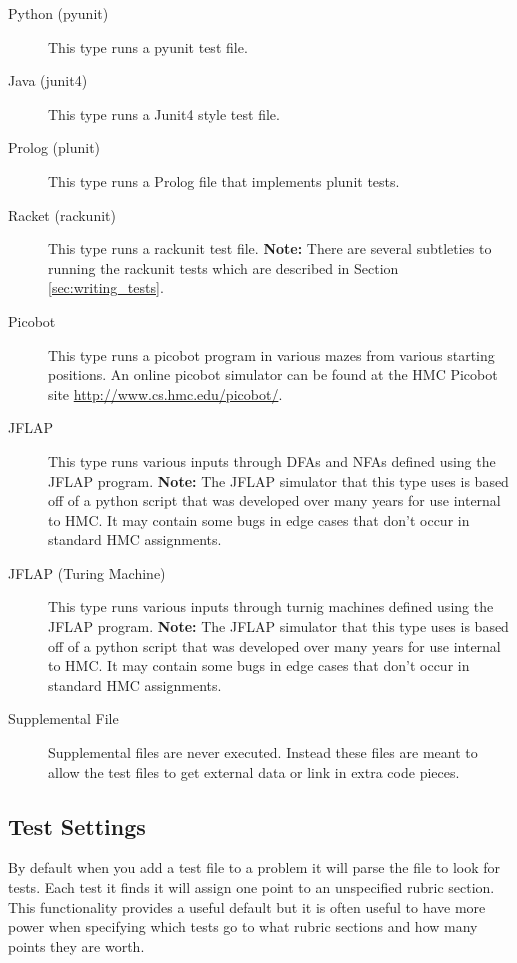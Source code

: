 \documentclass[11pt]{report}
\begin{document}
\begin{description}
\item[Python (pyunit)] This type runs a pyunit test file.
\item[Java (junit4)] This type runs a Junit4 style test file.
\item[Prolog (plunit)] This type runs a Prolog file that implements plunit tests.
\item[Racket (rackunit)] This type runs a rackunit test file. \textbf{Note:} There are 
several subtleties to running the rackunit tests which are described in Section \ref{sec:writing_tests}.
\item[Picobot] This type runs a picobot program in various mazes from various starting positions. 
An online picobot simulator can be found at the HMC Picobot site
\url{http://www.cs.hmc.edu/picobot/}.
\item[JFLAP] This type runs various inputs through DFAs and NFAs defined using the JFLAP program. 
\textbf{Note:} The JFLAP simulator that this type uses is based off of a python script that was developed
over many years for use internal to HMC. It may contain some bugs in edge cases that don't occur in standard
HMC assignments.
\item[JFLAP (Turing Machine)] This type runs various inputs through turnig machines defined using the JFLAP program. 
\textbf{Note:} The JFLAP simulator that this type uses is based off of a python script that was developed
over many years for use internal to HMC. It may contain some bugs in edge cases that don't occur in standard
HMC assignments.
\item[Supplemental File] Supplemental files are never executed. Instead these files are meant to allow
the test files to get external data or link in extra code pieces. 
\end{description}

\subsection{Test Settings}
By default when you add a test file to a problem it will parse the file to look for tests. Each test it 
finds it will assign one point to an unspecified rubric section. This functionality provides a useful
default but it is often useful to have more power when specifying which tests go to what rubric sections
and how many points they are worth. 
\end{document}
